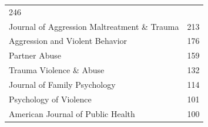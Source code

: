 \documentclass[]{tufte-handout}
\begin{document}
\begin{longtable}[]{@{}lr@{}}
\begin{minipage}[t]{0.09\columnwidth}
246\strut
\end{minipage}\tabularnewline
\begin{minipage}[t]{0.60\columnwidth}\raggedright\strut
Journal of Aggression Maltreatment \& Trauma\strut
\end{minipage} & \begin{minipage}[t]{0.09\columnwidth}\raggedleft\strut
213\strut
\end{minipage}\tabularnewline
\begin{minipage}[t]{0.60\columnwidth}\raggedright\strut
Aggression and Violent Behavior\strut
\end{minipage} & \begin{minipage}[t]{0.09\columnwidth}\raggedleft\strut
176\strut
\end{minipage}\tabularnewline
\begin{minipage}[t]{0.60\columnwidth}\raggedright\strut
Partner Abuse\strut
\end{minipage} & \begin{minipage}[t]{0.09\columnwidth}\raggedleft\strut
159\strut
\end{minipage}\tabularnewline
\begin{minipage}[t]{0.60\columnwidth}\raggedright\strut
Trauma Violence \& Abuse\strut
\end{minipage} & \begin{minipage}[t]{0.09\columnwidth}\raggedleft\strut
132\strut
\end{minipage}\tabularnewline
\begin{minipage}[t]{0.60\columnwidth}\raggedright\strut
Journal of Family Psychology\strut
\end{minipage} & \begin{minipage}[t]{0.09\columnwidth}\raggedleft\strut
114\strut
\end{minipage}\tabularnewline
\begin{minipage}[t]{0.60\columnwidth}\raggedright\strut
Psychology of Violence\strut
\end{minipage} & \begin{minipage}[t]{0.09\columnwidth}\raggedleft\strut
101\strut
\end{minipage}\tabularnewline
\begin{minipage}[t]{0.60\columnwidth}\raggedright\strut
American Journal of Public Health\strut
\end{minipage} & \begin{minipage}[t]{0.09\columnwidth}\raggedleft\strut
100\strut
\end{minipage}\tabularnewline

\end{longtable}
\end{document}
